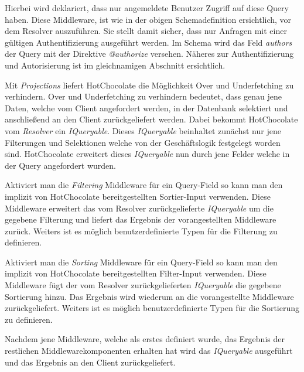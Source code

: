 Hierbei wird deklariert, dass nur angemeldete Benutzer Zugriff auf diese Query haben.
Diese Middleware, ist wie in der obigen Schemadefinition ersichtlich, vor dem Resolver auszuführen.
Sie stellt damit sicher, dass nur Anfragen mit einer gültigen Authentifizierung ausgeführt werden.
Im Schema wird das Feld \textit{authors} der Query mit der Direktive \textit{@authorize} versehen.
Näheres zur Authentifizierung und Autorisierung ist im gleichnamigen Abschnitt ersichtlich.

Mit \textit{Projections} liefert HotChocolate die Möglichkeit Over und Underfetching zu verhindern.
Over und Underfetching zu verhindern bedeutet, dass genau jene Daten, welche vom Client angefordert werden, in der Datenbank selektiert und anschließend an den Client zurückgeliefert werden.
Dabei bekommt HotChocolate vom \textit{Resolver} ein \textit{IQueryable}.
Dieses \textit{IQueryable} beinhaltet zunächst nur jene Filterungen und Selektionen welche von der Geschäftslogik festgelegt worden sind.
HotChocolate erweitert dieses \textit{IQueryable} nun durch jene Felder welche in der Query angefordert wurden.

Aktiviert man die \textit{Filtering} Middleware für ein Query-Field so kann man den implizit von HotChocolate bereitgestellten Sortier-Input verwenden.
Diese Middleware erweitert das vom Resolver zurückgelieferte \textit{IQueryable} um die gegebene Filterung und liefert das Ergebnis der vorangestellten Middleware zurück.
Weiters ist es möglich benutzerdefinierte Typen für die Filterung zu definieren.

Aktiviert man die \textit{Sorting} Middleware für ein Query-Field so kann man den implizit von HotChocolate bereitgestellten Filter-Input verwenden.
Diese Middleware fügt der vom Resolver zurückgelieferten \textit{IQueryable} die gegebene Sortierung hinzu.
Das Ergebnis wird wiederum an die vorangestellte Middleware zurückgeliefert.
Weiters ist es möglich benutzerdefinierte Typen für die Sortierung zu definieren.

Nachdem jene Middleware, welche als erstes definiert wurde, das Ergebnis der restlichen Middlewarekomponenten erhalten hat wird das \textit{IQueryable} ausgeführt und das Ergebnis an den Client zurückgeliefert.

